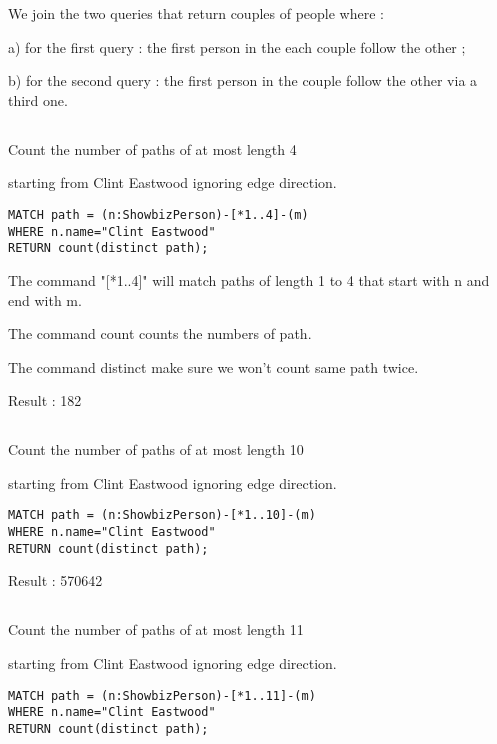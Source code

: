 We join the two queries that return couples of people where :

a) for the first query : the first person in the each couple follow the other ;

b) for the second query : the first person in the couple follow the other via a third one.

\subsection{}
Count the number of paths of at most length 4

starting from Clint Eastwood ignoring edge direction.

\begin{verbatim}
MATCH path = (n:ShowbizPerson)-[*1..4]-(m)
WHERE n.name="Clint Eastwood"
RETURN count(distinct path);
\end{verbatim}

The command "[*1..4]" will match paths of length 1 to 4 that start with n and end with  m.

The command count counts the numbers of path.

The command distinct make sure we won't count same path twice.

Result : 182

\subsection{}
Count the number of paths of at most length 10

starting from Clint Eastwood ignoring edge direction.

\begin{verbatim}
MATCH path = (n:ShowbizPerson)-[*1..10]-(m)
WHERE n.name="Clint Eastwood"
RETURN count(distinct path);
\end{verbatim}

Result : 570642

\subsection{}
Count the number of paths of at most length 11

starting from Clint Eastwood ignoring edge direction.

\begin{verbatim}
MATCH path = (n:ShowbizPerson)-[*1..11]-(m)
WHERE n.name="Clint Eastwood"
RETURN count(distinct path);
\end{verbatim}

